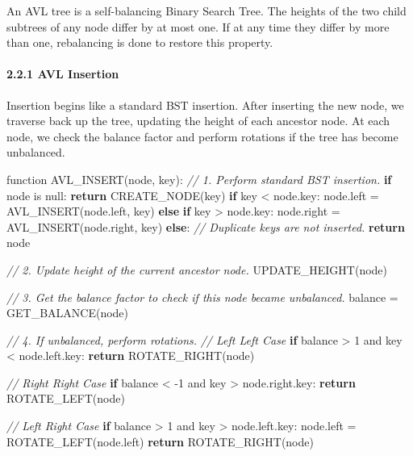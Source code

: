 \documentclass[
]{article}
\newenvironment{Shaded}{}{}
\newcommand{\CommentTok}[1]{\textcolor[rgb]{0.38,0.63,0.69}{\textit{#1}}}
\newcommand{\ControlFlowTok}[1]{\textcolor[rgb]{0.00,0.44,0.13}{\textbf{#1}}}
\newcommand{\DecValTok}[1]{\textcolor[rgb]{0.25,0.63,0.44}{#1}}
\newcommand{\NormalTok}[1]{#1}
\begin{document}
An AVL tree is a self-balancing Binary Search Tree. The heights of the
two child subtrees of any node differ by at most one. If at any time
they differ by more than one, rebalancing is done to restore this
property.

\hypertarget{avl-insertion}{%
\paragraph{2.2.1 AVL Insertion}\label{avl-insertion}}

Insertion begins like a standard BST insertion. After inserting the new
node, we traverse back up the tree, updating the height of each ancestor
node. At each node, we check the balance factor and perform rotations if
the tree has become unbalanced.

\begin{pcode}

\begin{Shaded}
\begin{Highlighting}[]
\NormalTok{function AVL\_INSERT(node, key):}
  \CommentTok{// 1. Perform standard BST insertion.}
  \ControlFlowTok{if}\NormalTok{ node is null:}
    \ControlFlowTok{return}\NormalTok{ CREATE\_NODE(key)}
  \ControlFlowTok{if}\NormalTok{ key \textless{} node.key:}
\NormalTok{    node.left = AVL\_INSERT(node.left, key)}
  \ControlFlowTok{else} \ControlFlowTok{if}\NormalTok{ key \textgreater{} node.key:}
\NormalTok{    node.right = AVL\_INSERT(node.right, key)}
  \ControlFlowTok{else}\NormalTok{: }\CommentTok{// Duplicate keys are not inserted.}
    \ControlFlowTok{return}\NormalTok{ node}

  \CommentTok{// 2. Update height of the current ancestor node.}
\NormalTok{  UPDATE\_HEIGHT(node)}

  \CommentTok{// 3. Get the balance factor to check if this node became unbalanced.}
\NormalTok{  balance = GET\_BALANCE(node)}

  \CommentTok{// 4. If unbalanced, perform rotations.}
  \CommentTok{// Left Left Case}
  \ControlFlowTok{if}\NormalTok{ balance \textgreater{} }\DecValTok{1}\NormalTok{ and key \textless{} node.left.key:}
    \ControlFlowTok{return}\NormalTok{ ROTATE\_RIGHT(node)}
  
  \CommentTok{// Right Right Case}
  \ControlFlowTok{if}\NormalTok{ balance \textless{} {-}}\DecValTok{1}\NormalTok{ and key \textgreater{} node.right.key:}
    \ControlFlowTok{return}\NormalTok{ ROTATE\_LEFT(node)}

  \CommentTok{// Left Right Case}
  \ControlFlowTok{if}\NormalTok{ balance \textgreater{} }\DecValTok{1}\NormalTok{ and key \textgreater{} node.left.key:}
\NormalTok{    node.left = ROTATE\_LEFT(node.left)}
    \ControlFlowTok{return}\NormalTok{ ROTATE\_RIGHT(node)}


\end{Highlighting}
\end{Shaded}
\end{pcode}
\end{document}
